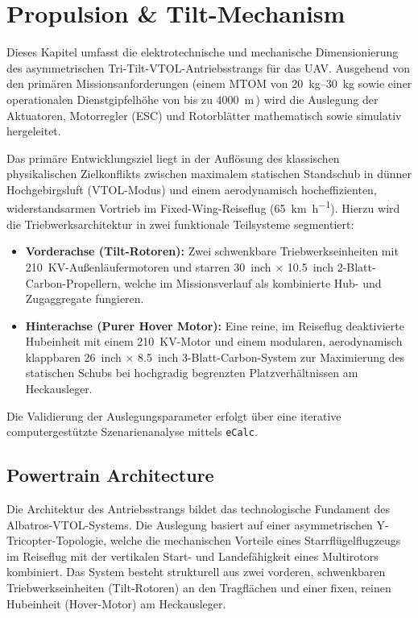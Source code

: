 ﻿\chapter{Propulsion \& Tilt-Mechanism}
\label{ch:propulsion_tilt}

Dieses Kapitel umfasst die elektrotechnische und mechanische Dimensionierung des asymmetrischen Tri-Tilt-VTOL-Antriebsstrangs für das UAV. Ausgehend von den primären Missionsanforderungen (einem MTOM von \SIrange{20}{30}{\kilo\gram} sowie einer operationalen Dienstgipfelhöhe von bis zu \SI{4000}{\meter}\,) wird die Auslegung der Aktuatoren, Motorregler (ESC) und Rotorblätter mathematisch sowie simulativ hergeleitet. 

\noindent Das primäre Entwicklungsziel liegt in der Auflösung des klassischen physikalischen Zielkonflikts zwischen maximalem statischen Standschub in dünner Hochgebirgsluft (VTOL-Modus) und einem aerodynamisch hocheffizienten, widerstandsarmen Vortrieb im Fixed-Wing-Reiseflug (\SI{65}{\kilo\meter\per\hour}). Hierzu wird die Triebwerksarchitektur in zwei funktionale Teilsysteme segmentiert:

\begin{itemize}
    \item \textbf{Vorderachse (Tilt-Rotoren):} Zwei schwenkbare Triebwerkseinheiten mit \SI{210}{KV}-Außenläufermotoren und starren \SI{30}{inch} $\times$ \SI{10.5}{inch} 2-Blatt-Carbon-Propellern, welche im Missionsverlauf als kombinierte Hub- und Zugaggregate fungieren.
    \item \textbf{Hinterachse (Purer Hover Motor):} Eine reine, im Reiseflug deaktivierte Hubeinheit mit einem \SI{210}{KV}-Motor und einem modularen, aerodynamisch klappbaren \SI{26}{inch} $\times$ \SI{8.5}{inch} 3-Blatt-Carbon-System zur Maximierung des statischen Schubs bei hochgradig begrenzten Platzverhältnissen am Heckausleger.
\end{itemize}

\noindent Die Validierung der Auslegungsparameter erfolgt über eine iterative computergestützte Szenarienanalyse mittels \texttt{eCalc}. 

\section{Powertrain Architecture}

\noindent
Die Architektur des Antriebsstrangs bildet das technologische Fundament des Albatros-VTOL-Systems. Die Auslegung basiert auf einer asymmetrischen Y-Tricopter-Topologie, welche die mechanischen Vorteile eines Starrflügelflugzeugs im Reiseflug mit der vertikalen Start- und Landefähigkeit eines Multirotors kombiniert. Das System besteht strukturell aus zwei vorderen, schwenkbaren Triebwerkseinheiten (Tilt-Rotoren) an den Tragflächen und einer fixen, reinen Hubeinheit (Hover-Motor) am Heckausleger.

